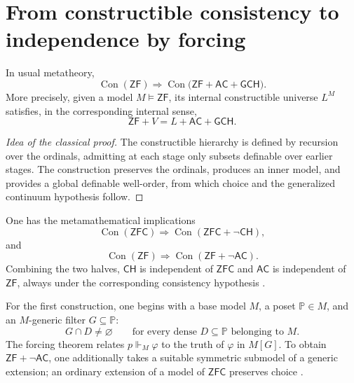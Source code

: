 \label{chap:p3-83-47-godel_cohen}

\section{From constructible consistency to independence by forcing}

\begin{theorem}
In usual metatheory,
\[
  \operatorname{Con}(\mathsf{ZF})
  \Longrightarrow
  \operatorname{Con}
  \bigl(\mathsf{ZF}+\mathsf{AC}+\mathsf{GCH}\bigr).
\]
More precisely, given a model \(M\models\mathsf{ZF}\), its internal
constructible universe \(L^M\) satisfies, in the corresponding internal sense,
\[
  \mathsf{ZF}+V=L+\mathsf{AC}+\mathsf{GCH}.
\]
\end{theorem}

\begin{proof}[Idea of the classical proof]
The constructible hierarchy is defined by recursion over the ordinals, admitting at each stage only subsets definable over earlier stages. The construction preserves the ordinals, produces an inner model, and provides a global definable well-order, from which choice and the generalized continuum hypothesis \citep{goedel1940} follow.
\end{proof}

\begin{theorem}
One has the metamathematical implications
\[
  \operatorname{Con}(\mathsf{ZFC})
  \Longrightarrow
  \operatorname{Con}(\mathsf{ZFC}+\neg\mathsf{CH}),
\]
and
\[
  \operatorname{Con}(\mathsf{ZF})
  \Longrightarrow
  \operatorname{Con}(\mathsf{ZF}+\neg\mathsf{AC}).
\]
Combining the two halves, \(\mathsf{CH}\) is independent of
\(\mathsf{ZFC}\) and \(\mathsf{AC}\) is independent of \(\mathsf{ZF}\),
always under the corresponding consistency hypothesis
\citep{cohen1963,cohen1964}.
\end{theorem}

For the first construction, one begins with a base model \(M\), a poset
\(\mathbb P\in M\), and an \(M\)-generic filter \(G\subseteq\mathbb P\):
\[
  G\cap D\ne\varnothing
  \qquad
  \text{for every dense }D\subseteq\mathbb P\text{ belonging to }M.
\]
The forcing theorem relates \(p\Vdash_M\varphi\) to the truth of
\(\varphi\) in \(M[G]\). To obtain
\(\mathsf{ZF}+\neg\mathsf{AC}\), one additionally takes a suitable symmetric
submodel of a generic extension; an ordinary extension of a model of
\(\mathsf{ZFC}\) preserves choice \citep{cohen1966}.

